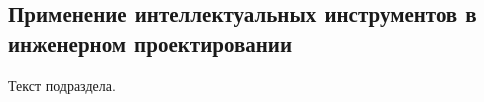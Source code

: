 \subsection{Применение интеллектуальных инструментов в инженерном проектировании}
\label{sec:development:ai}

Текст подраздела.
